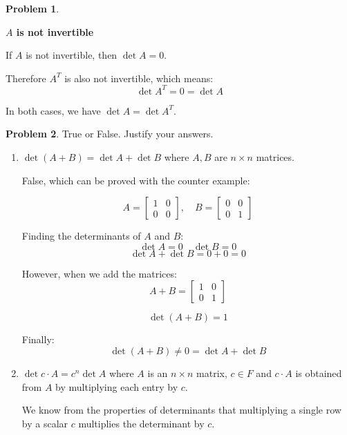 \documentclass[12pt, oneside]{amsart}
\theoremstyle{definition}
\newtheorem{prob}{Problem}
\begin{document}
\begin{prob}
\begin{enumerate}
\begin{solution}
    \textbf{$A$ is not invertible}
    
    If $A$ is not invertible, then $\det A = 0$.
    

    Therefore $A^T$ is also not invertible, which means:
    \[
    \det A^T = 0 = \det A
    \]
    
    \vspace{0.3cm}
    
    In both cases, we have $\det A = \det A^T$.
    \end{solution}
    \end{enumerate}
\end{prob}

\begin{prob} True or False. Justify your answers.
\begin{enumerate}
    \item  $\det (A+B) = \det A  +\det B$ where $A,B$ are $n\times n$ matrices.
    
    \begin{solution}
    False, which can be proved with the counter example:
    
    \[
    A = \begin{bmatrix} 1 & 0 \\ 0 & 0 \end{bmatrix}, \quad B = \begin{bmatrix} 0 & 0 \\ 0 & 1 \end{bmatrix}
    \]
    
    Finding the determinants of $A$ and $B$:
    \[
    \det A = 0 \quad \det B = 0
    \]
    \[
    \det A + \det B = 0 + 0 = 0
    \]
    
    However, when we add the matrices:
    \[
    A + B = \begin{bmatrix} 1 & 0 \\ 0 & 1 \end{bmatrix}
    \]
    
    \[
    \det(A+B) = 1 
    \]

    Finally:
  \[
  \det(A+B) \neq 0 = \det A + \det B
  \]

    \end{solution}
    
    \item $\det c\cdot A = c^n \det A$ where $A$ is an $n\times n$ matrix, $c\in F$ and $c\cdot A$ is obtained from $A$ by multiplying each entry by $c$.
    
    \begin{solution}
    We know from the properties of determinants that multiplying a single row by a scalar $c$ multiplies the determinant by $c$.
    

\end{solution}
\end{enumerate}
\end{prob}
\end{document}
